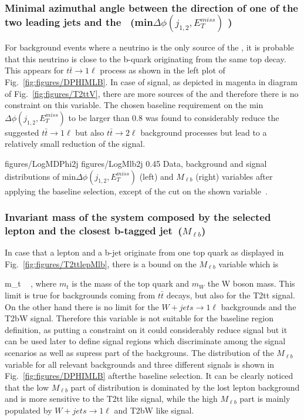\subsubsection{Minimal azimuthal angle between the direction of one of the two leading jets and the \MET~(min$\Delta \phi (j_{1,2}, E_{T}^{miss})$ )}

For background events where a neutrino is the only source of the \MET, it is probable that this neutrino is close to the b-quark  originating from the same top decay. This appears for $t\bar{t} \to 1\ell$ process as shown in the left plot of Fig.~\ref{fig:figures/DPHIMLB}. In case of signal, as depicted in magenta in diagram of Fig.~\ref{fig:figures/T2ttV}, there are more sources of the \MET and therefore there is no constraint on this variable. The chosen baseline requirement on the min$\Delta \phi (j_{1,2}, E_{T}^{miss})$ to be larger than 0.8 was found to considerably reduce the suggested $t\bar{t} \to 1\ell$ but also $t\bar{t} \to 2\ell$  background processes but lead to a relatively small reduction of the signal.

                 {figures/LogMDPhi2j} %
                 {figures/LogMlb2j} %
                 {0.45}       %
                 { Data, background and signal distributions of min$\Delta \phi (j_{1,2}, E_{T}^{miss})$ (left) and $M_{\ell b}$ (right) variables after applying the baseline selection, except of the cut on the shown variable~\cite{website:stopSupp}. }

\subsubsection{Invariant mass of the system composed by the selected lepton and the closest b-tagged jet~($M_{\ell b}$)}

In case that a lepton and a b-jet originate from one top quark as displayed in Fig.~\ref{fig:figures/T2ttlepMlb}, there is a bound on the $M_{\ell b}$ variable which is

{
 m_{t}  ~ ,
}
where $m_{t}$ is the mass of the top quark and $m_{W}$ the W boson mass. This limit is true for backgrounds coming from $t\bar{t}$ decays, but also for the T2tt signal. On the other hand there is no limit for the $W+jets \to 1\ell$  backgrounds and the T2bW signal. Therefore this variable is not suitable for the baseline region definition, as putting a constraint on it could considerably reduce signal but it can be used later to define signal regions which discriminate among the signal scenarios as well as supress part of the backgrouns. The distribution of the  $M_{\ell b}$ variable for all relevant backgrounds and three different signals is shown in Fig.~\ref{fig:figures/DPHIMLB} afterthe baseline selection. It can be clearly noticed that the low $M_{\ell b}$ part of distribution is dominated by the lost lepton background and is more sensitive to the T2tt like signal, while the high $M_{\ell b}$ part is mainly populated by $W+jets \to 1\ell$  and T2bW like signal.

